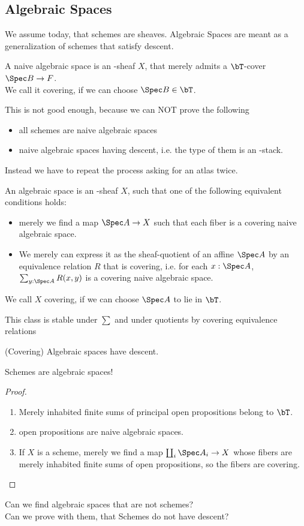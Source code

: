 \subsection{Algebraic Spaces}
We assume today, that schemes are \etale sheaves.
Algebraic Spaces are meant as a generalization of schemes that satisfy descent.
\begin{definition}
	A naive algebraic space is an \etale-sheaf $X$, that merely
	admits a $\bT$-cover $\Spec B \to F$. \\
	We call it covering, if we can choose $\Spec B \in \bT$.
\end{definition}
This is not good enough, because we can NOT prove the following
\begin{itemize}
	\item all schemes are naive algebraic spaces
	\item naive algebraic spaces having descent, i.e. the type of them is an \etale-stack. \\
\end{itemize}
Instead we have to repeat the process asking for an atlas twice. 
\begin{definition}
	An algebraic space is an \etale-sheaf $X$, such that one of the following equivalent conditions holds:
	\begin{itemize}
		\item 	 merely we find a map $\Spec A \to X$ such that each fiber is a covering naive algebraic space. 
		\item We merely can express it as the sheaf-quotient of an affine $\Spec A$ by an equivalence relation $R$ that is covering, i.e. for each $x : \Spec A$, $\sum_{y : \Spec A} R(x,y)$ is a covering naive algebraic space.  \\	
	\end{itemize}
	We call $X$ covering, if we can choose $\Spec A$ to lie in $\bT$.
\end{definition}
This class is stable under $\sum$ and under quotients by covering equivalence relations
\begin{theorem}
	(Covering) Algebraic spaces have descent.
\end{theorem}
\begin{example}
	Schemes are algebraic spaces!
\end{example}
\begin{proof}
	\begin{enumerate}
		\item 	Merely inhabited finite sums of principal open propositions belong to $\bT$. 
		\item open propositions are naive algebraic spaces. 
		\item	If $X$ is a scheme, merely we find a map $\coprod_i \Spec A_i \to X$ whose fibers are merely inhabited finite sums of open propositions, so the fibers are covering.
	\end{enumerate}
\end{proof}
\begin{question}
	Can we find algebraic spaces that are not schemes? \\
	Can we prove with them, that Schemes do not have descent? \\	
\end{question}
